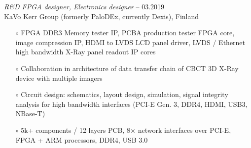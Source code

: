 \documentclass[margin , 10pt]{res} %
\begin{document}
\begin{resume}
		{\sl R\&D FPGA designer, Electronics designer }  -- 03.2019\\
		KaVo Kerr Group (formerly PaloDEx, currently Dexis), Finland\\
		\begin{itemize}
			\item[$\circ$] FPGA DDR3 Memory tester IP, PCBA production tester FPGA core, image compression IP, HDMI to LVDS LCD panel driver, LVDS / Ethernet high bandwidth X-Ray panel readout IP cores
			\item[$\circ$] Collaboration in architecture of data transfer chain of CBCT 3D X-Ray device with multiple imagers
			\item[$\circ$] Circuit design: schematics, layout design, simulation, signal integrity analysis for high bandwidth interfaces (PCI-E Gen. 3, DDR4,  HDMI, USB3, NBase-T) 
			\item[$\circ$] 5k+ components / 12 layers PCB, 8$\times$ network interfaces over PCI-E, FPGA + ARM processors, DDR4, USB 3.0
			

\end{itemize}
\end{resume}
\end{document}
